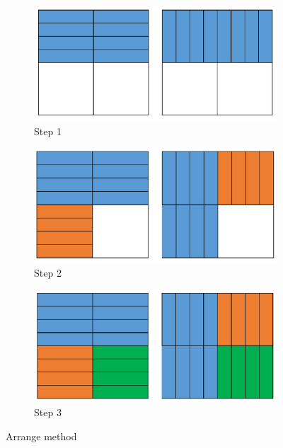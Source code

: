 \documentclass{article}
\begin{document}
\begin{figure}[H]
    \centering
    \begin{subfigure}{.2\textwidth}
      \centering
      \includegraphics[width=\textwidth]{2.png}
      \caption{Step 1}
    \end{subfigure}
    \begin{subfigure}{.2\textwidth}
      \centering
      \includegraphics[width=\textwidth]{3.png}
      \caption{Step 2}
    \end{subfigure}
    \newline
    \centering
    \begin{subfigure}{.2\textwidth}
      \centering
      \includegraphics[width=\textwidth]{4.png}
      \caption{Step 3}
    \end{subfigure}
    \caption{Arrange method}
    \label{fig:same}
    \end{figure}
\end{document}
